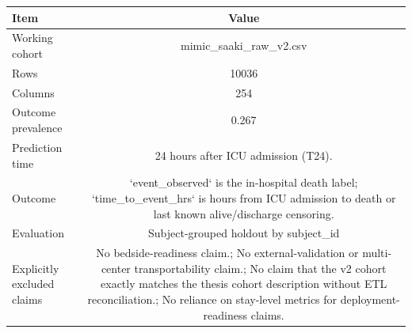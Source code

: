\begin{tabular}{@{}lc@{}}
\toprule
Item & Value\\
\midrule
Working cohort & mimic\_saaki\_raw\_v2.csv\\
Rows & 10036\\
Columns & 254\\
Outcome prevalence & 0.267\\
Prediction time & 24 hours after ICU admission (T24).\\
Outcome & `event\_observed` is the in-hospital death label; `time\_to\_event\_hrs` is hours from ICU admission to death or last known alive/discharge censoring.\\
Evaluation & Subject-grouped holdout by subject\_id\\
Explicitly excluded claims & No bedside-readiness claim.; No external-validation or multi-center transportability claim.; No claim that the v2 cohort exactly matches the thesis cohort description without ETL reconciliation.; No reliance on stay-level metrics for deployment-readiness claims.\\
\bottomrule
\end{tabular}
